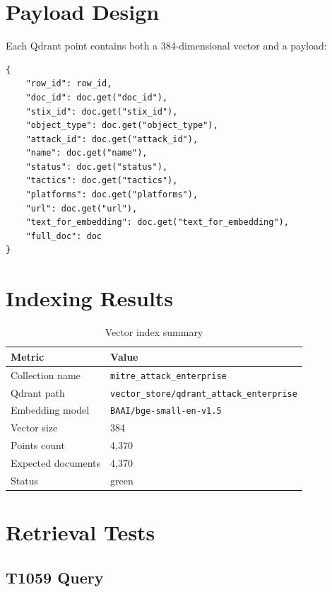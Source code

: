 \documentclass[12pt,a4paper]{report}
\begin{document}
\section{Payload Design}

Each Qdrant point contains both a 384-dimensional vector and a payload:

\begin{lstlisting}[style=pythonstyle]
{
    "row_id": row_id,
    "doc_id": doc.get("doc_id"),
    "stix_id": doc.get("stix_id"),
    "object_type": doc.get("object_type"),
    "attack_id": doc.get("attack_id"),
    "name": doc.get("name"),
    "status": doc.get("status"),
    "tactics": doc.get("tactics"),
    "platforms": doc.get("platforms"),
    "url": doc.get("url"),
    "text_for_embedding": doc.get("text_for_embedding"),
    "full_doc": doc
}
\end{lstlisting}

\section{Indexing Results}

\begin{table}[H]
\centering
\begin{tabular}{ll}
\toprule
\textbf{Metric} & \textbf{Value} \\
\midrule
Collection name & \texttt{mitre\_attack\_enterprise} \\
Qdrant path & \texttt{vector\_store/qdrant\_attack\_enterprise} \\
Embedding model & \texttt{BAAI/bge-small-en-v1.5} \\
Vector size & 384 \\
Points count & 4,370 \\
Expected documents & 4,370 \\
Status & green \\
\bottomrule
\end{tabular}
\caption{Vector index summary}
\end{table}

\section{Retrieval Tests}

\subsection{T1059 Query}
\end{document}
